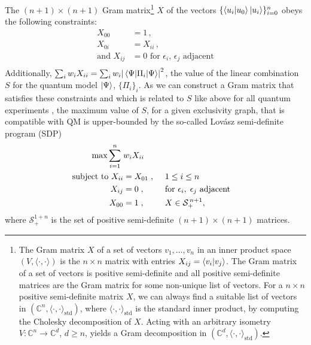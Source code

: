 \begin{itemize}
        
    The $(n+1)\times(n+1)$ Gram matrix\footnote{The Gram matrix $X$ of a set of vectors $v_1,\dots, v_n$ in an inner product space $(V,\langle \cdot, \cdot\rangle)$ is the $n\times n$ matrix with entries $X_{ij}=\bra{ v_i}\ket{ v_j}$. The Gram matrix of a set of vectors is positive semi-definite and all positive semi-definite matrices are the Gram matrix for some non-unique list of vectors. For a $n\times n$ positive semi-definite matrix $X$, we can always find a suitable list of vectors in $(\mathbb{C}^n, \langle \cdot, \cdot\rangle_{\text{std}})$, where $\langle \cdot, \cdot\rangle_{\text{std}}$ is the standard inner product, by computing the Cholesky decomposition of $X$. Acting with an arbitrary isometry $V:\mathbb{C}^n\rightarrow\mathbb{C}^d$, $d\geq n$, yields a Gram decomposition in $(\mathbb{C}^d,\langle \cdot, \cdot\rangle_{\text{std}})$.} $X$ of the vectors $\{\bra{u_i}\ket{u_0} \ket{u_i}\}_{i=0}^n$ obeys the following constraints:
    \begin{align*}
        X_{00} &= 1\,,\\
        X_{0i} &= X_{ii}\,,\\
        \text{and } X_{ij} &= 0 \text{ for $\epsilon_i$, $\epsilon_j$ adjacent} \\  
    \end{align*}
    Additionally, $\sum_i w_i X_{ii} = \sum_i w_i \abs{\expval{\Pi_i}{\Psi}}^2$, the value of the linear combination $S$ for the quantum model $\ket{\Psi}$, $\{\Pi_i\}_i$. As we can construct a Gram matrix that satisfies these constraints and which is related to $S$ like above for all quantum experiments , the maximum value of $S$, for a given exclusivity graph, that is compatible with QM is upper-bounded by the so-called Lovász semi-definite program (SDP) \cite{Bharti2019}
    \begin{alignat}{2}
    \label{eqn:lovaszsdp}
    \operatorname{max}\sum_{i=1}^n\; & w_i X_{ii} \nonumber\\
    \text{subject to } X_{ii} &=X_{01}\;,\hspace{1ex} && 1\leq i\leq n \\
    X_{ij} & = 0 \;, && \text{for } \epsilon_i,\; \epsilon_j \text{ adjacent} \nonumber\\
    X_{00} & = 1 \;,\; && X\in\mathcal{S}_{+}^{\thinspace n+1},\nonumber
    \end{alignat}
    where $\mathcal{S}_{+}^{1+n}$ is the set of positive semi-definite $(n+1)\times(n+1)$ matrices.
    

\end{itemize}
